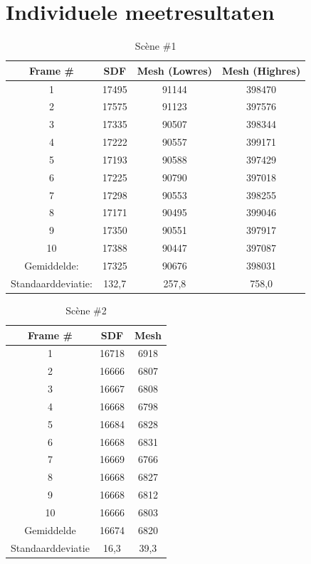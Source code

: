 \documentclass[12pt, a4paper]{article}
\begin{document}
\clearpage

\section{Individuele meetresultaten} \label{resultaten}
\begin{table}[H]
	\centering
	\begin{tabular}{| c | c c c |}
		\hline
		Frame \# & SDF & Mesh (Lowres) & Mesh (Highres) \\
		\hline
		1&17495&91144&398470 \\
		2&17575&91123&397576 \\
		3&17335&90507&398344 \\
		4&17222&90557&399171 \\
		5&17193&90588&397429 \\
		6&17225&90790&397018 \\
		7&17298&90553&398255 \\
		8&17171&90495&399046 \\
		9&17350&90551&397917 \\
		10&17388&90447&397087 \\
		\hline
		Gemiddelde:&17325&90676&398031 \\
		Standaarddeviatie:&132,7&257,8&758,0 \\
		\hline
	\end{tabular}
	\caption{Scène \#1}
\end{table}
\begin{table}[H]
	\centering
	\begin{tabular}{| c | c c |}
		\hline
		Frame \# & SDF & Mesh \\
		\hline
		1 &16718 &6918 \\
		2 &16666 &6807 \\
		3 &16667 &6808 \\
		4 &16668 &6798 \\
		5 &16684 &6828 \\
		6 &16668 &6831 \\
		7 &16669 &6766 \\
		8 &16668 &6827 \\
		9 &16668 &6812 \\
		10 &16666 &6803 \\
		\hline
		Gemiddelde &16674 &6820 \\
		Standaarddeviatie &16,3 &39,3 \\
		\hline
	\end{tabular}
	\caption{Scène \#2}
\end{table}
\end{document}
